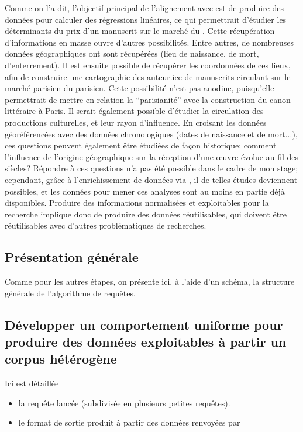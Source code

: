 Comme on l'a dit, l'objectif principal de l'alignement avec \wkd{} est de produire des données pour calculer des régressions linéaires, ce qui permettrait d'étudier les déterminants du prix d'un manuscrit sur le marché du . Cette récupération d'informations en masse ouvre d'autres possibilités. Entre autres, de nombreuses données géographiques ont sont récupérées (lieu de naissance, de mort, d'enterrement). Il est ensuite possible  de récupérer les coordonnées de ces lieux, afin de construire une cartographie des auteur.ice de manuscrits circulant sur le marché parisien du  parisien. Cette possibilité n'est pas anodine, puisqu'elle permettrait de mettre en relation la \enquote{parisianité} avec la construction du canon littéraire à Paris. Il serait également possible d'étudier la circulation des productions culturelles, et leur rayon d'influence. En croisant les données géoréférencées avec des données chronologiques (dates de naissance et de mort...), ces questions peuvent également être étudiées de façon historique: comment l'influence de l'origine géographique sur la réception d'une œuvre évolue au fil des siècles? Répondre à ces questions n'a pas été possible dans le cadre de mon stage; cependant, grâce à l'enrichissement de données via \sparql{}, il de telles études deviennent possibles, et les données pour mener ces analyses sont au moins en partie déjà disponibles. Produire des informations normalisées et exploitables pour la recherche implique donc de produire des données réutilisables, qui doivent être réutilisables avec d'autres problématiques de recherches.

\subsection{Présentation générale}
Comme pour les autres étapes, on présente ici, à l'aide d'un schéma, la structure générale de l'algorithme de requêtes.

\subsection{Développer un comportement uniforme pour produire des données exploitables à partir un corpus hétérogène}
Ici est détaillée 
\begin{itemize}
	\item la requête \sparql{} lancée (subdivisée en plusieurs petites requêtes).
	\item le format de sortie produit à partir des données renvoyées par \sparql
\end{itemize}

